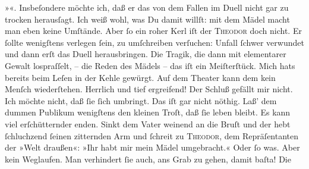 \begin{ledgroupsized}[t]{13cm}
                  »\label{K_L02726-1v}\label{K_L02726-1h}«. Insbeſondere möchte ich, daß er das von dem Fallen im
               Duell nicht gar zu trocken herausſagt. Ich weiß wohl, was Du damit willſt: mit {\pb}dem Mädel macht man eben keine Umſtände. Aber ſo ein
               roher Kerl iſt der \textsc{Theodor} doch nicht. Er ſollte wenigſtens verlegen ſein, zu umſchreiben verſuchen:
               Unfall {\dotsfour} ſchwer verwundet {\dotsfour} und
                   dann erſt das Duell herausbringen. Die Tragik,
               die dann mit elementarer Gewalt lospraſſelt, – die Reden des Mädels – das iſt ein Meiſterſtück. Mich hats bereits
               beim Leſen in der Kehle gewürgt. Auf dem Theater kann dem kein Menſch wiederſtehen.
               Herrlich und tief ergreifend! Der Schluß gefällt mir nicht. Ich möchte nicht, daß ſie ſich umbringt. Das iſt
                  {\pb}gar nicht nöthig. Laß’ dem dummen Publikum
               wenigſtens den kleinen Troſt, daß ſie leben bleibt. Es kann viel erſchütternder
               enden. Sinkt dem Vater weinend an die Bruſt und der hebt ſchluchzend ſeinen
               zitternden Arm und ſchreit zu \textsc{Theodor}, dem Repräſentanten der »Welt draußen«: »Ihr habt mir mein Mädel umgebracht.«
               Oder ſo was. Aber kein Weglaufen. Man verhindert  ſie auch, ans Grab zu gehen, damit baſta! Die

\end{ledgroupsized}
